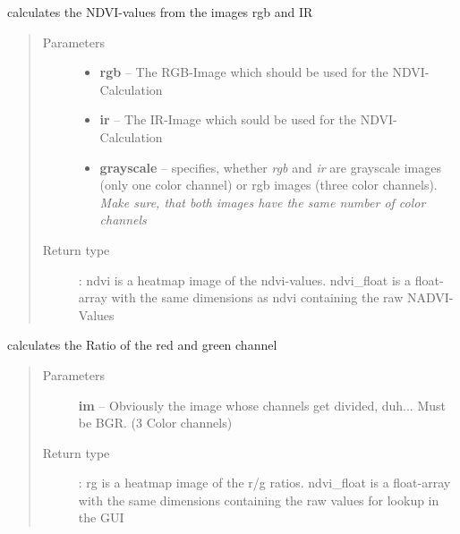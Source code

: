 \documentclass[a4paper,10pt,openany,oneside]{sphinxmanual}
\begin{document}
\begin{fulllineitems}
\label{index:scripts.image_processing.calculateNDVI}
calculates the NDVI-values from the images rgb and IR
\begin{quote}\begin{description}
\item[{Parameters}] \leavevmode\begin{itemize}
\item {}
\textbf{rgb} -- The RGB-Image which should be used for the NDVI-Calculation

\item {}
\textbf{ir} -- The IR-Image which sould be used for the NDVI-Calculation

\item {}
\textbf{grayscale} -- specifies, whether \emph{rgb} and \emph{ir} are grayscale images (only one color channel) or rgb images (three color channels). \emph{Make sure, that both images have the same number of color channels}

\end{itemize}

\item[{Return type}] \leavevmode
{}: ndvi is a heatmap image of the ndvi-values. ndvi\_float is a float-array with the same dimensions as ndvi containing the raw NADVI-Values

\end{description}\end{quote}

\end{fulllineitems}


\begin{fulllineitems}
\label{index:scripts.image_processing.calculateRGRatio}
calculates the Ratio of the red and green channel
\begin{quote}\begin{description}
\item[{Parameters}] \leavevmode
\textbf{im} -- Obviously the image whose channels get divided, duh... Must be
BGR. (3 Color channels)

\item[{Return type}] \leavevmode
{}: rg is a heatmap image of the r/g ratios. ndvi\_float is a
float-array with the same dimensions containing the raw values for lookup in the GUI

\end{description}\end{quote}

\end{fulllineitems}
\end{document}
